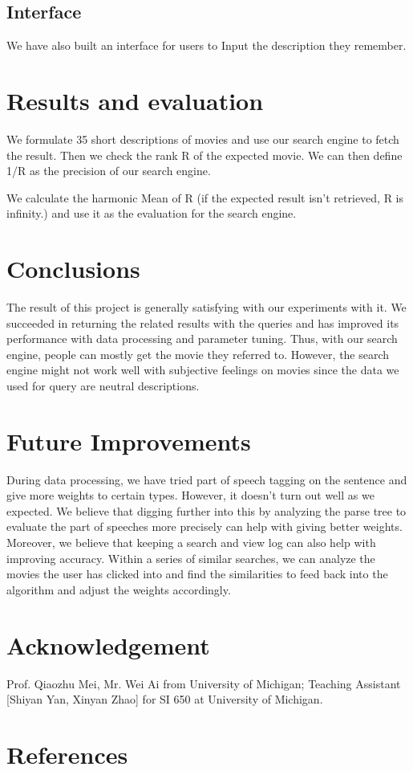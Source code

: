 \documentclass[letterpaper,10pt]{article}
\begin{document}
\begin{multicols}{2}
    \subsection{Interface }

    We have also built an interface for users to Input the description they remember.

    \section{Results and evaluation}

    We formulate 35 short descriptions of movies and use our search engine to fetch the result. Then we check the rank R of the expected movie. We can then define 1/R as the precision of our search engine.

    We calculate the harmonic Mean of R (if the expected result isn’t retrieved, R is infinity.) and use it as the evaluation for the search engine.

    \section{Conclusions}

    The result of this project is generally satisfying with our experiments with it. We succeeded in returning the related results with the queries and has improved its performance with data processing and parameter tuning. Thus, with our search engine, people can mostly get the movie they referred to. However, the search engine might not work well with subjective feelings on movies since the data we used for query are neutral descriptions.

    \section{Future Improvements}
    During data processing, we have tried part of speech tagging on the sentence and give more weights to certain types. However, it doesn’t turn out well as we expected. We believe that digging further into this by analyzing the parse tree to evaluate the part of speeches more precisely can help with giving better weights.
    Moreover, we believe that keeping a search and view log can also help with improving accuracy. Within a series of similar searches, we can analyze the movies the user has clicked into and find the similarities to feed back into the algorithm and adjust the weights accordingly.

    \section{Acknowledgement}

    Prof. Qiaozhu Mei, Mr. Wei Ai from University of Michigan;
    Teaching Assistant [Shiyan Yan, Xinyan Zhao] for SI 650 at University of Michigan.

    \section*{References}





\end{multicols}
\end{document}
